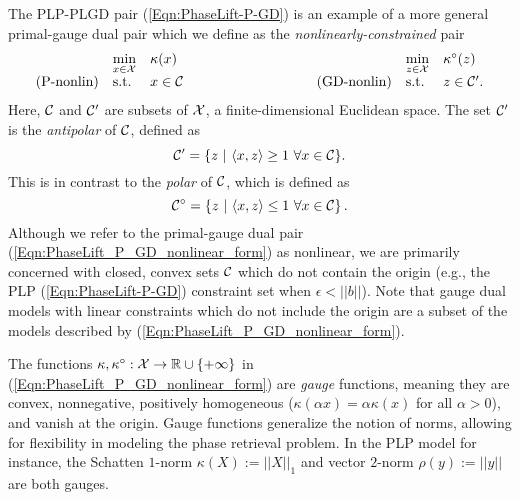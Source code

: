 The PLP-PLGD pair (\ref{Eqn:PhaseLift-P-GD}) is an example of a more general primal-gauge dual pair which we define as the \textit{nonlinearly-constrained} pair
\begin{equation} 			\label{Eqn:PhaseLift_P_GD_nonlinear_form}
\begin{array}{lllllll}
	&	\min\limits_{\substack{x \in \caX}}
		&	\kappa(x)
			&
				&	\min\limits_{\substack{z \in \caX}}
					&	\kappa^\circ(z)
						\\
\textnormal{(P-nonlin)}
	&	\st
		& 	x \in \caC
			&	\hspace{3cm} 	\textnormal{(GD-nonlin)}
				&	\st
					&	z \in \caC'.
\end{array}
\end{equation}
Here, ${\mathcal C}$ and ${\mathcal C}'$ are subsets of ${\mathcal X}$, a finite-dimensional Euclidean space.  The set ${\mathcal C}'$ is the \textit{antipolar} of ${\mathcal C}$, defined as
\begin{equation}  			\label{Def:antipolar_set}
{\mathcal C}' = \{ z \ | \ \langle x, z \rangle \geq 1 \ \forall x \in {\mathcal C} \}.
\end{equation}
This is in contrast to the \textit{polar} of ${\mathcal C}$, which is defined as
\begin{equation} 			\label{Def:polar}
{\mathcal C}^\circ = \left\{ z \ | \ \langle x, z \rangle \leq 1 \ \forall x \in {\mathcal C} \right\}.
\end{equation}
Although we refer to the primal-gauge dual pair (\ref{Eqn:PhaseLift_P_GD_nonlinear_form}) as nonlinear, we are primarily concerned with closed, convex sets ${\mathcal C}$ which do not contain the origin (e.g., the PLP (\ref{Eqn:PhaseLift-P-GD}) constraint set when $\epsilon < ||b||$).  
Note that gauge dual models with linear constraints which do not include the origin are a subset of the models described by (\ref{Eqn:PhaseLift_P_GD_nonlinear_form}).

The functions $\kappa, \kappa^\circ : {\mathcal X} \rightarrow {\mathbb R} \cup \{+\infty\}$ in (\ref{Eqn:PhaseLift_P_GD_nonlinear_form}) are \textit{gauge} functions, meaning they are convex, nonnegative, positively homogeneous ($\kappa(\alpha x) = \alpha \kappa(x)$ for all $\alpha > 0$), and vanish at the origin.  Gauge functions generalize the notion of norms, allowing for flexibility in modeling the phase retrieval problem.  In the PLP model for instance, the Schatten $1$-norm $\kappa(X) := || X ||_1$ and  vector $2$-norm $\rho(y) := ||y||$ are both gauges.

